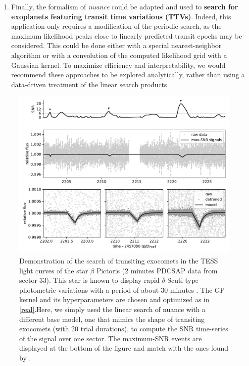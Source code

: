 \documentclass[modern,linenumbers]{aastex631}
\newcommand{\nuancemethod}{\textit{nuance}}
\newcommand{\nuancecode}{\textsf{nuance}}
\begin{document}
\begin{enumerate}
    \item Finally, the formalism of \nuancemethod{} could be adapted and used to \textbf{search for exoplanets featuring transit time variations (TTVs)}. Indeed, this application only requires a modification of the periodic search, as the maximum likelihood peaks close to linearly predicted transit epochs may be considered. This could be done either with a special nearest-neighbor algorithm or with a convolution of the computed likelihood grid with a Gaussian kernel. To maximize efficiency and interpretability, we would recommend these approaches to be explored analytically, rather than using a data-driven treatment of the linear search products.
\end{enumerate}
\begin{figure}[H]    
    \includegraphics[width=\linewidth]{exocomet.pdf}
    \caption{Demonstration of the search of transiting exocomets in the TESS light curves of the star $\beta$ Pictoris (2 minutes PDCSAP data from sector 33). This star is known to display rapid $\delta$ Scuti type photometric variations with a period of about 30 minutes \citep{Lecavelier2022}. The GP kernel and its hyperparameters are chosen and optimized as in \autoref{real}.Here, we simply used the linear search of \nuancecode{} with a different base model, one that mimics the shape of transiting exocomets (with 20 trial durations), to compute the SNR time-series of the signal over one sector. The maximum-SNR events are displayed at the bottom of the figure and match with the ones found by \cite{Lecavelier2022}.}
    \label{fig:exoco} 
\end{figure}
\end{document}
